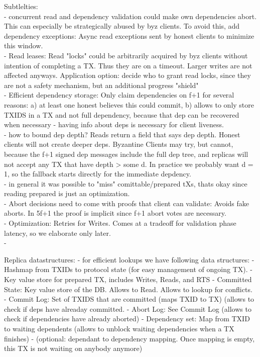 Subtlelties:\\
- concurrent read and dependency validation could make own dependencies abort. This can especially be strategically abused by byz clients. To avoid this, add dependency exceptions: Async read exceptions sent by honest clients to minimize this window.\\
- Read leases: Read "locks" could be arbitrarily acquired by byz clients without intention of completing a TX. Thus they are on a timeout. Larger writes are not affected anyways. Application option: decide who to grant read locks, since they are not a safety mechanism, but an additional progress "shield"\\
- Efficient dependency storage: Only claim dependencies on f+1 for several reasons: a) at least one honest believes this could commit, b) allows to only store TXIDS in a TX and not full dependency, because that dep can be recovered when necessary - having info about deps is necessary for client liveness.\\

- how to bound dep depth? Reads return a field that says dep depth. Honest clients will not create deeper deps. Byzantine Clients may try, but cannot, because the f+1 signed dep messages include the full dep tree, and replicas will not accept any TX that have depth > some d. In practice we probably want d = 1, so the fallback starts directly for the immediate depdency.\\
	- in general it was possible to "miss" comittable/prepared tXs, thats okay since reading prepared is just an optimization.\\
	
- Abort decisions need to come with proofs that client can validate: Avoids fake aborts. In 5f+1 the proof is implicit since f+1 abort votes are necessary.\\
- Optimization: Retries for Writes. Comes at a tradeoff for validation phase latency, so we elaborate only later.\\
-
	
Replica datastructures:
- for efficient lookups we have following data structures:
-   Hashmap from TXIDs to protocol state (for easy management of ongoing TX). 
- Key value store for prepared TX, includes Writes, Reads, and RTS
- Committed State: Key value store of the DB. Allows to Read. Allows to lookup for conflicts.
- Commit Log: Set of TXIDS that are committed (maps TXID to TX)  (allows to check if deps have alreaday committed. 
- Abort Log: See Commit Log (allows to check if dependencies have already aborted)
- Dependency set: Map from TXID to waiting dependents (allows to unblock waiting dependencies when a TX finishes)
- (optional: dependant to dependency mapping. Once mapping is empty, this TX is not waiting on anybody anymore)



